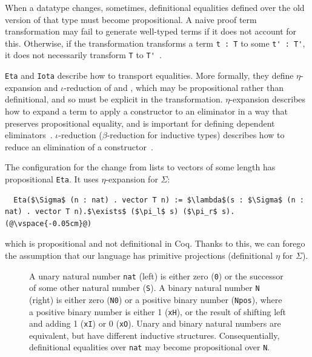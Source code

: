 When a datatype changes, sometimes, definitional equalities defined over the old version of that type must become propositional.
A naive proof term transformation may fail to generate well-typed terms if it does not account for this.
Otherwise, if the transformation transforms a term \lstinline{t : T} to some \lstinline{t' : T'}, it does not necessarily
transform \lstinline{T} to \lstinline{T'}~\cite{tabareau2019marriage}.

\lstinline{Eta} and \lstinline{Iota} describe how to transport equalities.
More formally, they define $\eta$-expansion and $\iota$-reduction of \Aa and \B,
which may be propositional rather than definitional,
and so must be explicit in the transformation.
$\eta$-expansion describes how to expand a term to apply a constructor to an eliminator in a way that preserves propositional equality,
and is important for defining dependent eliminators~\cite{nlab:eta-conversion}.
$\iota$-reduction ($\beta$-reduction for inductive types) describes how to reduce an elimination of a constructor~\cite{nlab:beta-reduction}.

The configuration for the change from lists to vectors of some length has propositional \lstinline{Eta}.
It uses $\eta$-expansion for $\Sigma$:

\begin{lstlisting}
  Eta($\Sigma$ (n : nat) . vector T n) := $\lambda$(s : $\Sigma$ (n : nat) . vector T n).$\exists$ ($\pi_l$ s) ($\pi_r$ s).(@\vspace{-0.05cm}@)
\end{lstlisting}
which is propositional and not definitional in Coq.
Thanks to this, we can forego the assumption that our language has primitive projections (definitional $\eta$ for $\Sigma$).

\begin{figure}
\begin{minipage}{0.44\columnwidth}
   
\end{minipage}
\hfill
\begin{minipage}{0.54\columnwidth}
   
\end{minipage}
\vspace{-0.2cm}
\caption{A unary natural number \lstinline{nat} (left) is either zero (\lstinline{0}) or the successor of some other natural number (\lstinline{S}).
A binary natural number \lstinline{N} (right) is either zero (\lstinline{N0}) or a positive binary number (\lstinline{Npos}), where a positive binary number is either 1 (\lstinline{xH}), or the result of shifting left and adding 1 (\lstinline{xI}) or
0 (\lstinline{xO}). Unary and binary natural numbers are equivalent, but have different inductive structures.
Consequentially, definitional equalities over \lstinline{nat} may become propositional over \lstinline{N}.}
\vspace{-0.2cm}
\label{fig:nattobin}
\end{figure}


